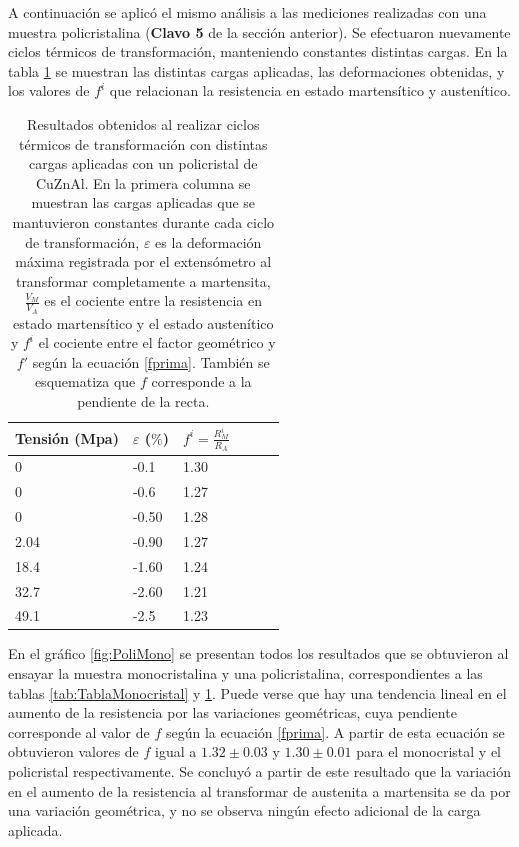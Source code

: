 \documentclass[a4paper,12pt,fleqn,twoside,openany]{book}
\begin{document}
A continuación se aplicó el mismo análisis a las mediciones realizadas con una muestra policristalina (\textbf{Clavo 5} de la sección anterior). Se efectuaron nuevamente ciclos térmicos de transformación, manteniendo constantes distintas cargas. En la tabla \ref{tab:TablaPolicristal} se muestran las distintas cargas aplicadas, las deformaciones obtenidas, y los valores de $f^i$ que relacionan la resistencia en estado martensítico y austenítico. 

\begin{table} 
\begin{center} 
\begin{tabular}{@{}llllll@{}} \toprule
Tensión (Mpa) & $\varepsilon$ ($\%$) &  $f^i=\frac{R_M ^i}{R_A}$\\ \midrule
 0        &  -0.1   & 1.30\\
 0       &  -0.6   & 1.27 \\
 0      &  -0.50   & 1.28 \\
 2.04      &  -0.90  & 1.27\\
 18.4    &  -1.60  & 1.24 \\
32.7      &  -2.60 & 1.21\\
 49.1     &  -2.5  & 1.23   \\
 \bottomrule
\end{tabular}
\caption{Resultados obtenidos al realizar ciclos térmicos de transformación con distintas cargas aplicadas con un policristal de CuZnAl. En la primera columna se muestran las cargas aplicadas que se mantuvieron constantes durante cada ciclo de transformación, $\varepsilon$ es la deformación máxima registrada por el extensómetro al transformar completamente a martensita, $\frac{V_M}{V_A}$ es el cociente entre la resistencia en estado martensítico y el estado austenítico y $f^i$ el cociente entre el factor geométrico y $f'$ según la ecuación \ref{fprima}. También se esquematiza que $f$ corresponde a la pendiente de la recta.}
\label{tab:TablaPolicristal}
\end{center}
\end{table}

En el gráfico \ref{fig:PoliMono} se presentan todos los resultados que se obtuvieron al ensayar la muestra monocristalina y una policristalina, correspondientes a las tablas \ref{tab:TablaMonocristal} y \ref{tab:TablaPolicristal}. Puede verse que hay una tendencia lineal en el aumento de la resistencia por las variaciones geométricas, cuya pendiente corresponde al valor de $f$ según la ecuación \ref{fprima}. A partir de esta ecuación se obtuvieron valores de $f$ igual a $1.32\pm0.03$ y $1.30 \pm 0.01$ para el monocristal y el policristal respectivamente.  Se concluyó a partir de este resultado que la variación en el aumento de la resistencia al transformar de austenita a martensita se da por una variación geométrica, y no se observa ningún efecto adicional de la carga aplicada.
\end{document}

